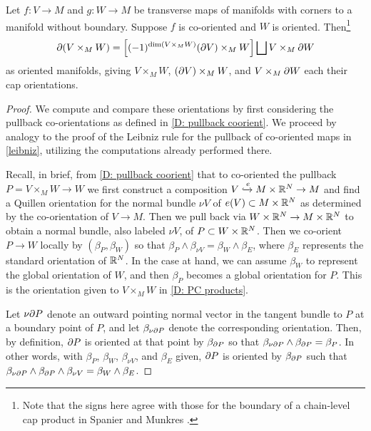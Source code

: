 \begin{proposition}\label{P: Leibniz cap}
	Let $f \colon V \to M$ and $g \colon W \to M$ be transverse maps of manifolds with corners to a manifold without boundary.
	Suppose $f$ is co-oriented and $W$ is oriented.
	Then\footnote{Note that the signs here agree with those for the boundary of a chain-level cap product in Spanier \cite[Section 5.6.15]{Span81} and Munkres \cite[Section 66]{Mun84}.} $$\partial(V \times_M W) = \left[(-1)^{\dim(V \times_M W)} (\partial V) \times_M W\right] \bigsqcup V \times_M \partial W$$
	as oriented manifolds, giving $V \times_M W$, $(\partial V) \times_M W$, and $V \times_M \partial W$ each their cap orientations.
\end{proposition}
\begin{proof}
	We compute and compare these orientations by first considering the pullback co-orientations as defined in \cref{D: pullback coorient}.
	We proceed by analogy to the proof of the Leibniz rule for the pullback of co-oriented maps in \cref{leibniz}, utilizing the computations already performed there.

	Recall, in brief, from \cref{D: pullback coorient} that to co-oriented the pullback $P = V \times_M W \to W$ we first construct a composition $V\xhookrightarrow{e} M \times \mathbb{R}^N \to M$ and find a Quillen orientation for the normal bundle $\nu V$ of $e(V) \subset M \times \mathbb{R}^N$ as determined by the co-orientation of $V \to M$.
	Then we pull back via $W \times \mathbb{R}^N \to M \times \mathbb{R}^N$ to obtain a normal bundle, also labeled $\nu V$, of $P \subset W \times \mathbb{R}^N$.
	Then we co-orient $P \to W$ locally by $(\beta_P,\beta_W)$ so that $\beta_P \wedge \beta_{\nu V} = \beta_W \wedge \beta_E$, where $\beta_E$ represents the standard orientation of $\mathbb{R}^N$.
	In the case at hand, we can assume $\beta_W$ to represent the global orientation of $W$, and then $\beta_P$ becomes a global orientation for $P$.
	This is the orientation given to $V \times_M W$ in \cref{D: PC products}.

	Let $\nu\partial P$ denote an outward pointing normal vector in the tangent bundle to $P$ at a boundary point of $P$, and let $\beta_{\nu\partial P}$ denote the corresponding orientation.
	Then, by definition, $\partial P$ is oriented at that point by $\beta_{\partial P}$ so that $\beta_{\nu\partial P} \wedge \beta_{\partial P} = \beta_P$.
	In other words, with $\beta_P$, $\beta_W$, $\beta_{\nu V}$, and $\beta_E$ given, $\partial P$ is oriented by $\beta_{\partial P}$ such that $\beta_{\nu\partial P} \wedge \beta_{\partial P} \wedge \beta_{\nu V} = \beta_W \wedge \beta_E$.


\end{proof}
